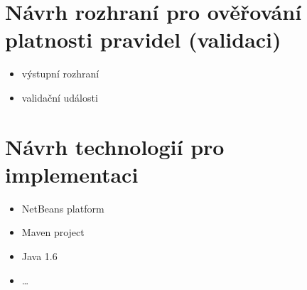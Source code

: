 \section{Návrh rozhraní pro ověřování platnosti pravidel (validaci)}
\begin{itemize}
\item výstupní rozhraní
\item validační události
\end{itemize}

%
%

\section{Návrh technologií pro implementaci}
\begin{itemize}
\item NetBeans platform
\item Maven project
\item Java 1.6
\item \ldots
\end{itemize}

